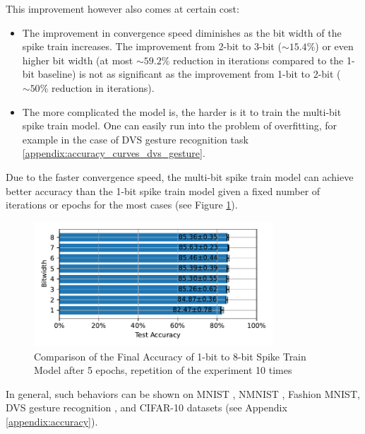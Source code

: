     This improvement however also comes at certain cost:
    \begin{itemize}
        \item The improvement in convergence speed diminishes as the bit width of the spike train increases. The improvement from 2-bit to 3-bit ($\sim 15.4\%$) or even higher bit width (at most $\sim 59.2\%$ reduction in iterations compared to the 1-bit baseline) is not as significant as the improvement from 1-bit to 2-bit ($\sim 50\%$ reduction in iterations).
        \item The more complicated the model is, the harder is it to train the multi-bit spike train model. One can easily run into the problem of overfitting, for example in the case of DVS gesture recognition task \ref{appendix:accuracy_curves_dvs_gesture}.
    \end{itemize}

    Due to the faster convergence speed, the multi-bit spike train model can achieve better accuracy than the 1-bit spike train model given a fixed number of iterations or epochs for the most cases (see Figure \ref{fig:final_accuracy}).
    \begin{figure}[!htpb]
        \centering
        \includegraphics[width=0.8\textwidth]{../standard/FashionMNIST/plots/fashionmnist_final_acc_horizontal.pdf}
        \caption{Comparison of the Final Accuracy of 1-bit to 8-bit Spike Train Model after 5 epochs, repetition of the experiment 10 times}
        \label{fig:final_accuracy}
    \end{figure}

    In general, such behaviors can be shown on MNIST \cite{deng2012mnist}, NMNIST \cite{10.3389/fnins.2015.00437}, Fashion MNIST, DVS gesture recognition \cite{8100264}, and CIFAR-10 datasets (see Appendix \ref{appendix:accuracy}).

